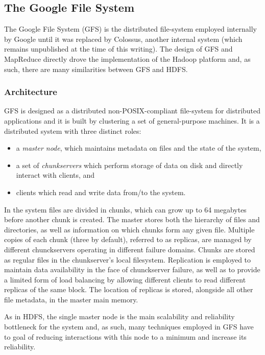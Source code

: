 \subsection{The Google File System}
The Google File System (GFS) \cite{DBLP:conf/sosp/GhemawatGL03} is the distributed file-system employed internally by Google until it was replaced by Colossus, another internal system (which remains unpublished at the time of this writing). 
The design of GFS and MapReduce \cite{DBLP:journals/cacm/DeanG08} directly drove the implementation of the Hadoop platform and, as such, there are many similarities between GFS and HDFS.

\subsubsection{Architecture}
GFS is designed as a distributed non-POSIX-compliant file-system for distributed applications and it is built by clustering a set of general-purpose machines.
It is a distributed system with three distinct roles: 
\begin{itemize}
    \item a \emph{master node}, which maintains metadata on files and the state of the system,
    \item a set of \emph{chunkservers} which perform storage of data on disk and directly interact with clients, and
    \item clients which read and write data from/to the system.
\end{itemize}
In the system files are divided in chunks, which can grow up to 64 megabytes before another chunk is created.
The master stores both the hierarchy of files and directories, as well as information on which chunks form any given file.
Multiple copies of each chunk (three by default), referred to as replicas, are managed by different chunckservers operating in different failure domains.
Chunks are stored as regular files in the chunkserver's local filesystem.
Replication is employed to maintain data availability in the face of chunckserver failure, as well as to provide a limited form of load balancing by allowing different clients to read different replicas of the same block.
The location of replicas is stored, alongside all other file metadata, in the master main memory.

As in HDFS, the single master node is the main scalability and reliability bottleneck for the system and, as such, many techniques employed in GFS have to goal of reducing interactions with this node to a minimum and increase its reliability.
